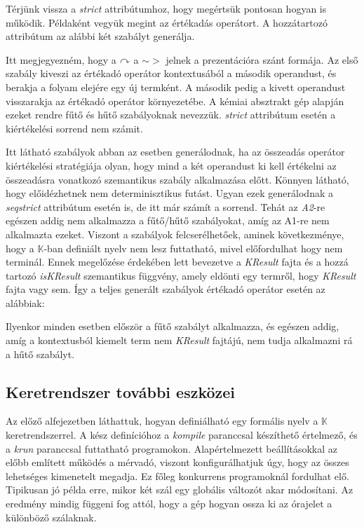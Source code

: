 Térjünk vissza a \textit{strict} attribútumhoz, hogy megértsük pontosan hogyan is működik. Példaként vegyük megint az értékadás operátort. A hozzátartozó attribútum az alábbi két szabályt generálja.



Itt megjegyezném, hogy a $\curvearrowright$ a $\sim>$ jelnek a prezentációra szánt formája. Az első szabály kiveszi az értékadó operátor kontextusából a második operandust, és berakja a folyam elejére egy új termként. A második pedig a kivett operandust visszarakja az értékadó operátor környezetébe. A kémiai absztrakt gép alapján ezeket rendre fűtő és hűtő szabályoknak nevezzük. \textit{strict} attribútum esetén a kiértékelési sorrend nem számit.



Itt látható szabályok abban az esetben generálodnak, ha az összeadás operátor kiértékelési stratégiája olyan, hogy mind a két operandust ki kell értékelni az összeadásra vonatkozó szemantikus szabály alkalmazása előtt. Könnyen látható, hogy előidézhetnek nem determinisztikus futást. Ugyan ezek generálodnak a \textit{seqstrict} attribútum esetén is, de itt már számít a sorrend. Tehát az \textit{A2}-re egészen addig nem alkalmazza a fűtő/hűtő szabályokat, amíg az A1-re nem alkalmazta ezeket. Viszont a szabályok felcserélhetőek, aminek következménye, hogy a $\mathbb{K}$-ban definiált nyelv nem lesz futtatható, mivel előfordulhat hogy nem terminál. Ennek megelőzése érdekében lett bevezetve a \textit{KResult} fajta és a hozzá tartozó \textit{isKResult} szemantikus függvény, amely eldönti egy termről, hogy \textit{KResult} fajta vagy sem. Így a teljes generált szabályok értékadó operátor esetén az alábbiak:



Ilyenkor minden esetben először a fűtő szabályt alkalmazza, és egészen addig, amíg a kontextusból kiemelt term nem \textit{KResult} fajtájú, nem tudja alkalmazni rá a hűtő szabályt.

\subsection{Keretrendszer további eszközei}

Az előző alfejezetben láthattuk, hogyan definiálható egy formális nyelv a $\mathbb{K}$ keretrendszerrel. A kész definícióhoz a \textit{kompile} paranccsal készíthető értelmező, és a \textit{krun} paranccsal futtatható programokon. Alapértelmezett beállításokkal az előbb említett működés a mérvadó, viszont konfigurálhatjuk úgy, hogy az összes lehetséges kimenetelt megadja. Ez főleg konkurrens programoknál fordulhat elő. Tipikusan jó példa erre, mikor két szál egy globális változót akar módosítani. Az eredmény mindig függeni fog attól, hogy a gép hogyan ossza ki az órajelet a különböző szálaknak.

